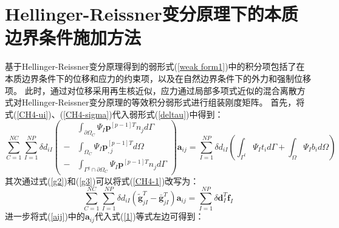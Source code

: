 \section{Hellinger-Reissner变分原理下的本质边界条件施加方法}
基于Hellinger-Reissner变分原理得到的弱形式(\ref{weak form1})中的积分项包括了在本质边界条件下的位移和应力的约束项，以及在自然边界条件下的外力和强制位移项。
此时，通过对位移采用再生核近似，应力通过局部多项式近似的混合离散方式对Hellinger-Reissner变分原理的等效积分弱形式进行组装刚度矩阵。
首先，将式(\ref{CH4-ui})、(\ref{CH4-sigma})代入弱形式(\ref{deltau})中得到：
\begin{equation}\label{CH4-1}
\sum_{C=1}^{N\!C}\sum_{I=1}^{N\!P}\delta d_{iI} \left (
        \begin{split}
        &\int_{\partial\Omega_C}\Psi_I\pmb{p}^{[p-1]T}n_jd\Gamma \\
        -&\int_{\Omega_C}\Psi_I\pmb{p}_{,j}^{[p-1]T}d\Omega \\
        -&\int_{\Gamma^g\cap\partial\Omega_C}\Psi_I\pmb{p}^{[p-1]T}n_jd\Gamma
        \end{split}
        \right )\pmb{a}_{ij}=
\sum_{I=1}^{N\!P}\delta d_{iI}(\int_{\Gamma^t}\Psi_It_id\Gamma+\int_{\Omega}\Psi_Ib_id\Omega)
\end{equation}
其次通过式(\ref{g2})和(\ref{g3})可以将式(\ref{CH4-1})改写为：
\begin{equation}\label{1}
    \sum_{C=1}^{N\!C}\sum_{I=1}^{N\!P}\delta d_{iI}(\tilde{\pmb g}_{jI}^T-\bar{\pmb g}_{jI}^T)\pmb{a}_{ij}=\sum_{I=1}^{N\!P}\delta\pmb{d}_I^T\pmb{f}_I
\end{equation}
进一步将式(\ref{aij})中的$\pmb{a}_{ij}$代入式(\ref{1})等式左边可得到：
\newpage
